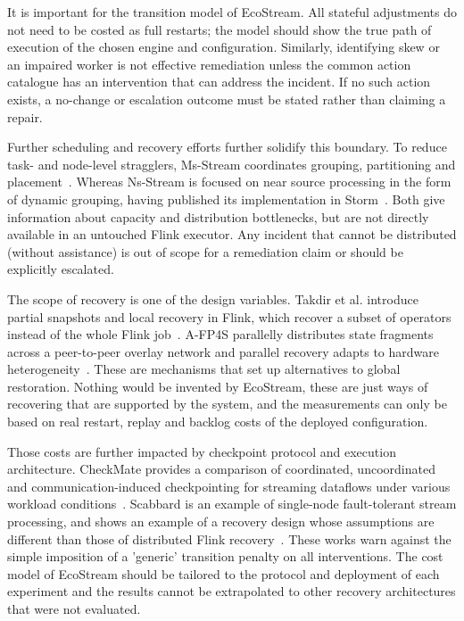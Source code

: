 It is important for the transition model of EcoStream. All stateful adjustments do not need to be costed as full restarts; the model should show the true path of execution of the chosen engine and configuration. Similarly, identifying skew or an impaired worker is not effective remediation unless the common action catalogue has an intervention that can address the incident. If no such action exists, a no-change or escalation outcome must be stated rather than claiming a repair.

Further scheduling and recovery efforts further solidify this boundary. To reduce task- and node-level stragglers, Ms-Stream coordinates grouping, partitioning and placement~\cite{wu2025msstream}. Whereas Ns-Stream is focused on near source processing in the form of dynamic grouping, having published its implementation in Storm~\cite{wu2025nsstream}. Both give information about capacity and distribution bottlenecks, but are not directly available in an untouched Flink executor. Any incident that cannot be distributed (without assistance) is out of scope for a remediation claim or should be explicitly escalated.

The scope of recovery is one of the design variables. Takdir et al. introduce partial snapshots and local recovery in Flink, which recover a subset of operators instead of the whole Flink job~\cite{takdir2025localrecovery}. A-FP4S parallelly distributes state fragments across a peer-to-peer overlay network and parallel recovery adapts to hardware heterogeneity~\cite{xu2023afp4s}. These are mechanisms that set up alternatives to global restoration. Nothing would be invented by EcoStream, these are just ways of recovering that are supported by the system, and the measurements can only be based on real restart, replay and backlog costs of the deployed configuration.

Those costs are further impacted by checkpoint protocol and execution architecture. CheckMate provides a comparison of coordinated, uncoordinated and communication-induced checkpointing for streaming dataflows under various workload conditions~\cite{siachamis2024checkmate}. Scabbard is an example of single-node fault-tolerant stream processing, and shows an example of a recovery design whose assumptions are different than those of distributed Flink recovery~\cite{theodorakis2021scabbard}. These works warn against the simple imposition of a 'generic' transition penalty on all interventions. The cost model of EcoStream should be tailored to the protocol and deployment of each experiment and the results cannot be extrapolated to other recovery architectures that were not evaluated.

